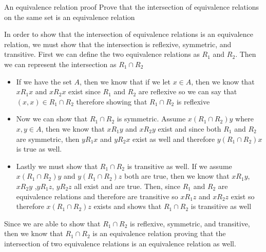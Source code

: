 An equivalence relation proof
Prove that the intersection of equivalence relations on the same set is an equivalence relation

\begin{solution}
In order to show that the intersection of equivalence relations is an equivalence relation, we must show that the intersection is reflexive, symmetric, and transitive. First we can define the two equivalence relations as $R_1$ and $R_2$. Then we can represent the intersection as $R_1\cap R_2$

\begin{itemize}
    \item If we have the set $A$, then we know that if we let $x\in A$, then we know that $xR_1x$ and $xR_2x$ exist since $R_1$ and $R_2$ are reflexive so we can say that $(x,x)\in R_1\cap R_2$ therefore showing that $R_1\cap R_2$ is reflexive
    \item Now we can show that $R_1\cap R_2$ is symmetric. Assume $x(R_1\cap R_2)y$ where $x,y \in A$, then we know that $xR_1y$ and $xR_2y$ exist and since both $R_1$ and $R_2$ are symmetric, then $yR_1x$ and $yR_2x$ exist as well and therefore $y(R_1\cap R_2)x$ is true as well.
    \item Lastly we must show that $R_1\cap R_2$ is transitive as well. If we assume $x(R_1\cap R_2)y$ and $y(R_1\cap R_2)z$ both are true, then we know that $xR_1y$, $xR_2y$ ,$yR_1z$, $yR_2z$ all exist and are true. Then, since $R_1$ and $R_2$ are equivalence relations and therefore are transitive so $xR_1z$ and $xR_2z$ exist so therefore $x(R_1\cap R_2)z$ exists and shows that $R_1\cap R_2$ is transitive as well
\end{itemize}
Since we are able to show that $R_1\cap R_2$ is reflexive, symmetric, and transitive, then we know that $R_1\cap R_2$ is an equivalence relation proving that the intersection of two equivalence relations is an equivalence relation as well.
\end{solution}